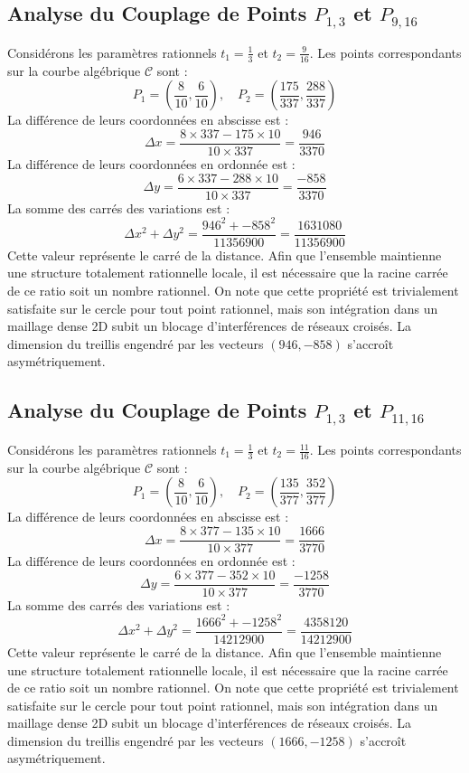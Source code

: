 \documentclass[12pt, a4paper]{article}
\begin{document}
\subsection{Analyse du Couplage de Points $P_{1,3}$ et $P_{9,16}$}
Considérons les paramètres rationnels $t_1 = \frac{1}{3}$ et $t_2 = \frac{9}{16}$.
Les points correspondants sur la courbe algébrique $\mathcal{C}$ sont :
$$ P_1 = \left( \frac{8}{10}, \frac{6}{10} \right), \quad P_2 = \left( \frac{175}{337}, \frac{288}{337} \right) $$
La différence de leurs coordonnées en abscisse est :
$$ \Delta x = \frac{8 \times 337 - 175 \times 10}{10 \times 337} = \frac{946}{3370} $$
La différence de leurs coordonnées en ordonnée est :
$$ \Delta y = \frac{6 \times 337 - 288 \times 10}{10 \times 337} = \frac{-858}{3370} $$
La somme des carrés des variations est :
$$ \Delta x^2 + \Delta y^2 = \frac{ 946^2 + -858^2 }{ 11356900 } = \frac{ 1631080 }{ 11356900 } $$
Cette valeur représente le carré de la distance. Afin que l'ensemble maintienne une structure totalement rationnelle locale, il est nécessaire que la racine carrée de ce ratio soit un nombre rationnel. On note que cette propriété est trivialement satisfaite sur le cercle pour tout point rationnel, mais son intégration dans un maillage dense 2D subit un blocage d'interférences de réseaux croisés. La dimension du treillis engendré par les vecteurs $( 946, -858 )$ s'accroît asymétriquement.


\subsection{Analyse du Couplage de Points $P_{1,3}$ et $P_{11,16}$}
Considérons les paramètres rationnels $t_1 = \frac{1}{3}$ et $t_2 = \frac{11}{16}$.
Les points correspondants sur la courbe algébrique $\mathcal{C}$ sont :
$$ P_1 = \left( \frac{8}{10}, \frac{6}{10} \right), \quad P_2 = \left( \frac{135}{377}, \frac{352}{377} \right) $$
La différence de leurs coordonnées en abscisse est :
$$ \Delta x = \frac{8 \times 377 - 135 \times 10}{10 \times 377} = \frac{1666}{3770} $$
La différence de leurs coordonnées en ordonnée est :
$$ \Delta y = \frac{6 \times 377 - 352 \times 10}{10 \times 377} = \frac{-1258}{3770} $$
La somme des carrés des variations est :
$$ \Delta x^2 + \Delta y^2 = \frac{ 1666^2 + -1258^2 }{ 14212900 } = \frac{ 4358120 }{ 14212900 } $$
Cette valeur représente le carré de la distance. Afin que l'ensemble maintienne une structure totalement rationnelle locale, il est nécessaire que la racine carrée de ce ratio soit un nombre rationnel. On note que cette propriété est trivialement satisfaite sur le cercle pour tout point rationnel, mais son intégration dans un maillage dense 2D subit un blocage d'interférences de réseaux croisés. La dimension du treillis engendré par les vecteurs $( 1666, -1258 )$ s'accroît asymétriquement.
\end{document}
